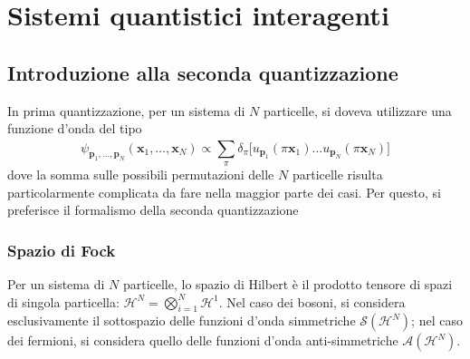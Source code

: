 \documentclass[11pt, a4paper]{scrartcl}
\theoremstyle{style}
\theoremstyle{style1}
\numberwithin{equation}{subsection}
\begin{document}
\newpage

\section{Sistemi quantistici interagenti}
\subsection{Introduzione alla seconda quantizzazione}
In prima quantizzazione, per un sistema di $N$ particelle, si doveva utilizzare una funzione d'onda del tipo
\[
\psi _{\mathbf{p} _1,\ldots,\mathbf{p}_N }  (\mathbf{x} _1,\ldots,\mathbf{x} _N) \propto \sum_{\pi}^{} \delta _\pi \Big[u_{\mathbf{p} _1} (\pi\mathbf{x} _1) \ldots u_{\mathbf{p} _N} (\pi\mathbf{x} _N)\Big]
\] 
dove la somma sulle possibili permutazioni delle $N$ particelle risulta particolarmente complicata da fare nella maggior parte dei casi. 
Per questo, si preferisce il formalismo della seconda quantizzazione
\subsubsection{Spazio di Fock}
Per un sistema di $N$ particelle, lo spazio di Hilbert \`e il prodotto tensore di spazi di singola particella: $\mathcal{H} ^N = \bigotimes_{i=1}^N \mathcal{H} ^{1} $. Nel caso dei bosoni, si considera esclusivamente il sottospazio delle funzioni d'onda simmetriche $\mathcal{S} (\mathcal{H} ^N)$; nel caso dei fermioni, si considera quello delle funzioni d'onda anti-simmetriche $\mathcal{A} (\mathcal{H} ^N)$.
\end{document}
